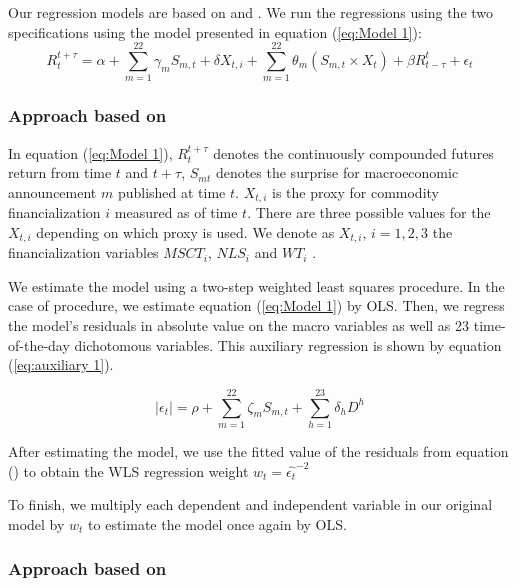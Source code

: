 \documentclass[12pt]{article}
\begin{document}
Our regression models are based on \citet{kurov2019price} and \citet{andersen2007real}. We run the regressions using the two specifications using the model presented in equation (\ref{eq:Model 1}):
\begin{equation}\label{eq:Model 1}
R_{t}^{t+\tau}=\alpha+\sum_{m=1}^{22} \gamma_m S_{m,t}+ \delta X_{t,i} + \sum_{m=1}^{22} \theta_m (S_{m,t} \times X_t)+\beta R_{t-\tau}^{t}+\epsilon_{t} 
\end{equation}

\subsubsection{Approach based on \citet*{andersen2007real}}

In equation (\ref{eq:Model 1}), $R_{t}^{t+\tau}$ denotes the continuously compounded futures return from time $t$ and $t+\tau$, $S_{mt}$ denotes the surprise for macroeconomic announcement $m$ published at time $t$. $X_{t,i}$ is the proxy for commodity financialization $i$ measured as of time $t$. There are three possible values for the $X_{t,i}$ depending on which proxy is used. We denote as $X_{t,i}$, $i={1,2,3}$ the financialization variables $MSCT_i$, $NLS_i$ and $WT_i$ . %

We estimate the model using a two-step weighted least squares procedure. In the case of \citet{andersen2007real} procedure, we estimate equation (\ref{eq:Model 1}) by OLS. Then, we regress the model's residuals in absolute value on the macro variables as well as 23 time-of-the-day dichotomous variables. This auxiliary regression is shown by equation (\ref{eq:auxiliary 1}).

\begin{equation}\label{eq:auxiliary 1}
\mid \epsilon_{t} \mid=\rho+\sum_{m=1}^{22} \zeta_m S_{m,t}+\sum_{h=1}^{23} \delta_h D^h
\end{equation}


After estimating the model, we use the fitted value of the residuals from equation (\label{eq:auxiliary 1}) to obtain the WLS regression weight $w_t = \hat{\epsilon_t}^{-2}$
%

To finish, we multiply each dependent and independent variable in our original model by $w_t$ to estimate the model once again by OLS.

\subsubsection{Approach based on \citet*{kurov2019price}}
\end{document}

